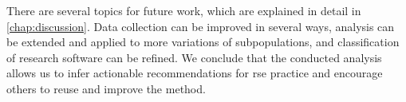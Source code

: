There are several topics for future work, which are explained in detail in \autoref{chap:discussion}. Data collection can be improved in several ways, analysis can be extended and applied to more variations of subpopulations, and classification of research software can be refined.
We conclude that the conducted analysis allows us to infer actionable recommendations for \acrshort{rse} practice and encourage others to reuse and improve the method.
















